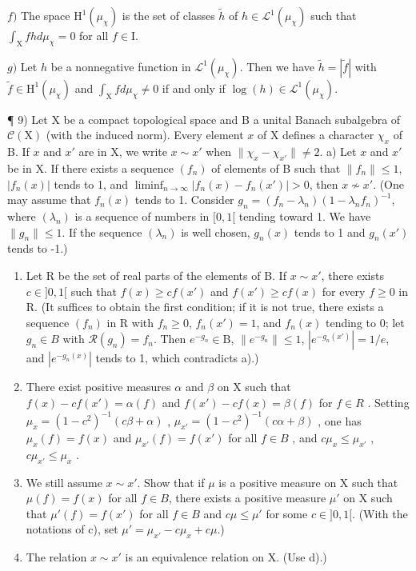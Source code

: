 \(f)\) The space \(\mathrm{H}^1 (\mu_\chi)\) is the set of classes \(\widetilde{h}\) of \(h\in \mathcal{L}^1 (\mu_\chi)\) such that \(\int_{\mathrm{X}}fh  d\mu_{\chi} = 0\) for all \(f\in \mathrm{I}\).

\(g)\) Let \(h\) be a nonnegative function in \(\mathcal{L}^1 (\mu_\chi)\). Then we have \(\widetilde{h} = |\widetilde{f}|\) with \(\widetilde{f}\in \mathrm{H}^1 (\mu_\chi)\) and \(\int_{\mathrm{X}}f  d\mu_{\chi}\neq 0\) if and only if \(\log (h)\in \mathcal{L}^1 (\mu_\chi)\).

¶ 9) Let X be a compact topological space and B a unital Banach subalgebra of \(\mathcal{C}(\mathrm{X})\) (with the induced norm). Every element \(x\) of X defines a character \(\chi_x\) of B. If \(x\) and \(x'\) are in X, we write \(x \sim x'\) when \(\| \chi_x - \chi_{x'} \| \neq 2\). a) Let \(x\) and \(x'\) be in X. If there exists a sequence \((f_n)\) of elements of B such that \(\| f_n \| \leqslant 1\), \(|f_n(x)|\) tends to 1, and \(\liminf_{n \to \infty} |f_n(x) - f_n(x')| > 0\), then \(x\not\sim x'\). (One may assume that \(f_n(x)\) tends to 1. Consider \(g_n = (f_n - \lambda_n)(1 - \lambda_n f_n)^{-1}\), where \((\lambda_n)\) is a sequence of numbers in \([0,1[\) tending toward 1. We have \(\| g_n \| \leqslant 1\). If the sequence \((\lambda_n)\) is well chosen, \(g_n(x)\) tends to 1 and \(g_n(x')\) tends to -1.)

\begin{enumerate}
\def\labelenumi{\alph{enumi})}
\setcounter{enumi}{1}
\item
  Let R be the set of real parts of the elements of B. If \(x \sim x'\), there exists \(c \in ]0,1[\) such that \(f(x) \geqslant cf(x')\) and \(f(x') \geqslant cf(x)\) for every \(f \geqslant 0\) in R. (It suffices to obtain the first condition; if it is not true, there exists a sequence \((f_n)\) in R with \(f_n \geqslant 0\), \(f_n(x') = 1\), and \(f_n(x)\) tending to 0; let \(g_n \in B\) with \(\mathcal{R}(g_n) = f_n\). Then \(e^{-g_n} \in \mathrm{B}\), \(\| e^{-g_n} \| \leqslant 1\), \(|e^{-g_n(x')}| = 1 / e\), and \(|e^{-g_n(x)}|\) tends to 1, which contradicts a).)
\item
  There exist positive measures \(\alpha\) and \(\beta\) on X such that \(f(x)-cf(x')=\alpha(f)\) and \(f(x')-cf(x)=\beta(f)\) for \(f\in R\) . Setting \(\mu_{x}=(1-c^{2})^{-1}(c\beta+\alpha)\) , \(\mu_{x'}=(1-c^{2})^{-1}(c\alpha+\beta)\) , one has \(\mu_{x}(f)=f(x)\) and \(\mu_{x'}(f)=f(x')\) for all \(f\in B\) , and \(c\mu_{x}\leqslant\mu_{x'}\) , \(c\mu_{x'}\leqslant\mu_{x}\) .
\item
  We still assume \(x \sim x'\). Show that if \(\mu\) is a positive measure on X such that \(\mu(f) = f(x)\) for all \(f \in B\), there exists a positive measure \(\mu'\) on X such that \(\mu'(f) = f(x')\) for all \(f \in B\) and \(c\mu \leqslant \mu'\) for some \(c \in]0,1[\). (With the notations of c), set \(\mu' = \mu_{x'} - c\mu_x + c\mu\).)
\item
  The relation \(x \sim x'\) is an equivalence relation on X. (Use d).)
\end{enumerate}

